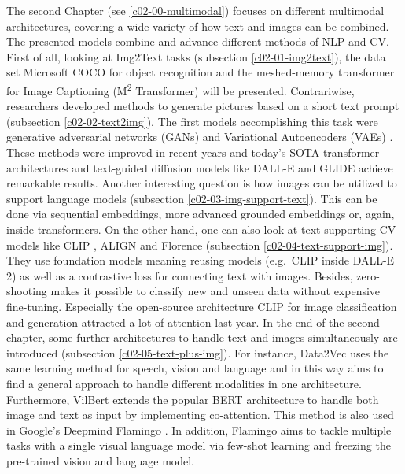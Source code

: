 \documentclass[
]{krantz}
\begin{document}
The second Chapter (see \ref{c02-00-multimodal}) focuses on different multimodal architectures, covering a wide variety of how text and images can be combined. The presented models combine and advance different methods of NLP and CV. First of all, looking at Img2Text tasks (subsection \ref{c02-01-img2text}), the data set Microsoft COCO for object recognition \citep{COCO} and the meshed-memory transformer for Image Captioning (M\textsuperscript{2} Transformer) \citep{meshed_memory} will be presented. Contrariwise, researchers developed methods to generate pictures based on a short text prompt (subsection \ref{c02-02-text2img}). The first models accomplishing this task were generative adversarial networks (GANs) \citep{GAN} and Variational Autoencoders (VAEs) \citep{VAE}. These methods were improved in recent years and today's SOTA transformer architectures and text-guided diffusion models like DALL-E \citep{DALLE} and GLIDE \citep{GLIDE} achieve remarkable results. Another interesting question is how images can be utilized to support language models (subsection \ref{c02-03-img-support-text}). This can be done via sequential embeddings, more advanced grounded embeddings or, again, inside transformers. On the other hand, one can also look at text supporting CV models like CLIP \citep{CLIP}, ALIGN \citep{ALIGN} and Florence \citep{yuan2021florence} (subsection \ref{c02-04-text-support-img}). They use foundation models meaning reusing models (e.g.~CLIP inside DALL-E 2) as well as a contrastive loss for connecting text with images. Besides, zero-shooting makes it possible to classify new and unseen data without expensive fine-tuning. Especially the open-source architecture CLIP \citep{CLIP} for image classification and generation attracted a lot of attention last year. In the end of the second chapter, some further architectures to handle text and images simultaneously are introduced (subsection \ref{c02-05-text-plus-img}). For instance, Data2Vec uses the same learning method for speech, vision and language and in this way aims to find a general approach to handle different modalities in one architecture. Furthermore, VilBert \citep{VilBert} extends the popular BERT architecture to handle both image and text as input by implementing co-attention. This method is also used in Google's Deepmind Flamingo \citep{alayrac2022flamingo}. In addition, Flamingo aims to tackle multiple tasks with a single visual language model via few-shot learning and freezing the pre-trained vision and language model.
\end{document}

